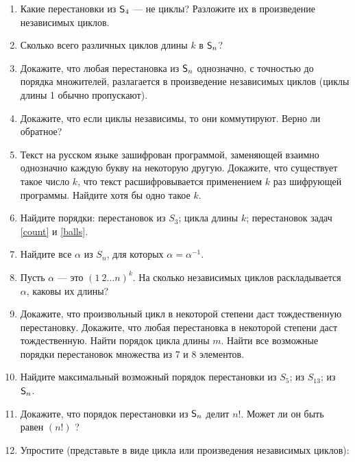 \begin{enumerate}
\item Какие перестановки из ${\mathsf{S}}_4$ --- не циклы? Разложите их в произведение независимых циклов.

\item Сколько всего различных циклов длины $k$ в ${\mathsf{S}}_n$?

\item Докажите, что любая перестановка из ${\mathsf{S}}_n$ однозначно, с точностью до порядка множителей, разлагается в произведение независимых циклов (циклы длины 1 обычно пропускают).

\item \ipunkt Докажите, что если циклы независимы, то они коммутируют. \ipunkt Верно ли обратное?

\item Текст на русском языке зашифрован программой, заменяющей взаимно однозначно каждую
букву на некоторую другую.
\ipunkt
Докажите, что существует такое число $k$, что текст
расшифровывается применением $k$ раз шифрующей программы.
\ipunkt
Найдите хотя бы одно такое $k$.


\item Найдите порядки: \ipunkt перестановок из $S_3$; \ipunkt цикла длины $k$; \ipunkt перестановок задач \ref{count} и \ref{balls}.

\item Найдите все $\alpha$ из $S_n$, для которых $\alpha=\alpha^{-1}$.

\item Пусть $\alpha$ --- это $(1\ 2 \dots n)^k$.
На сколько независимых циклов раскладывается $\alpha$, каковы их длины?

\item \ipunkt Докажите, что произвольный цикл в некоторой степени даст
тождественную перестановку. \ipunkt Докажите, что любая перестановка в некоторой степени даст тождественную.
\ipunkt Найти порядок цикла длины $m$.
\ipunkt Найти все возможные порядки перестановок множества из 7 и 8 элементов.
\item Найдите максимальный возможный порядок перестановки
\ipunkt из $S_5$; \ipunkt из $S_{13}$; \ipunkt *из ${\mathsf{S}}_n$.

\item Докажите, что порядок перестановки из ${\mathsf{S}}_n$ делит $n!$. Может ли он быть равен $(n!)$ ?

\item Упростите (представьте в виде цикла или произведения независимых циклов):\nopagebreak


\end{enumerate}
